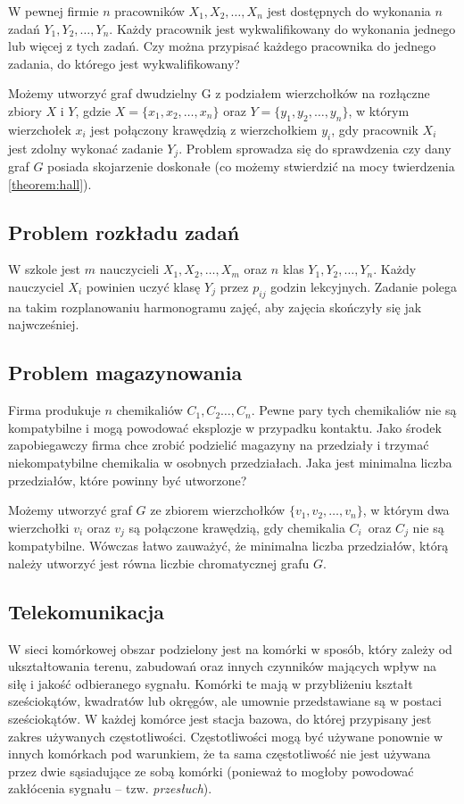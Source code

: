 W pewnej firmie $n$ pracowników $X_1,X_2,\ldots,X_n$ jest dostępnych do wykonania $n$ zadań $Y_1,Y_2,\ldots,Y_n$. Każdy pracownik jest wykwalifikowany do wykonania jednego lub więcej z tych zadań. Czy można przypisać każdego pracownika do jednego zadania, do którego jest wykwalifikowany? 

Możemy utworzyć graf dwudzielny G z podziałem wierzchołków na rozłączne zbiory $X$ i $Y$, gdzie $X=\{x_1,x_2,\ldots,x_n\}$ oraz $Y=\{y_1,y_2,\ldots,y_n\}$, w którym wierzchołek $x_i$ jest połączony krawędzią z wierzchołkiem $y_i$, gdy pracownik $X_i$ jest zdolny wykonać zadanie $Y_j$. Problem sprowadza się do sprawdzenia czy dany graf $G$ posiada skojarzenie doskonałe (co możemy stwierdzić na mocy twierdzenia \ref{theorem:hall}).


\subsection*{Problem rozkładu zadań}

W szkole jest $m$ nauczycieli $X_1,X_2,\ldots,X_m$ oraz $n$ klas $Y_1,Y_2,\ldots,Y_n$. Każdy nauczyciel $X_i$ powinien uczyć klasę $Y_j$ przez $p_{ij}$ godzin lekcyjnych. Zadanie polega na takim rozplanowaniu harmonogramu zajęć, aby zajęcia skończyły się jak najwcześniej. 


\subsection*{Problem magazynowania}

Firma produkuje $n$ chemikaliów $C_1,C_2\ldots,C_n$. Pewne pary tych chemikaliów nie są kompatybilne i mogą powodować eksplozje w przypadku kontaktu. Jako środek zapobiegawczy firma chce zrobić podzielić magazyny na przedziały i trzymać niekompatybilne chemikalia w osobnych przedziałach. Jaka jest minimalna liczba przedziałów, które powinny być utworzone?

Możemy utworzyć graf $G$ ze zbiorem wierzchołków $\{v_1,v_2,\ldots,v_n\}$, w którym dwa wierzchołki $v_i$ oraz $v_j$ są połączone krawędzią, gdy chemikalia $C_i$~oraz $C_j$ nie są kompatybilne. Wówczas łatwo zauważyć, że minimalna liczba przedziałów, którą należy utworzyć jest równa liczbie chromatycznej grafu $G$. 


\subsection*{Telekomunikacja}

W sieci komórkowej obszar podzielony jest na komórki w sposób, który zależy od  ukształtowania terenu, zabudowań oraz innych czynników mających wpływ na siłę i jakość odbieranego sygnału. Komórki te mają w przybliżeniu kształt sześciokątów, kwadratów lub okręgów, ale umownie przedstawiane są w postaci sześciokątów. W każdej komórce jest stacja bazowa, do której przypisany jest zakres używanych częstotliwości. Częstotliwości mogą być używane ponownie w innych komórkach pod warunkiem, że ta sama częstotliwość nie jest używana przez dwie sąsiadujące ze sobą komórki (ponieważ to mogłoby powodować zakłócenia sygnału -- tzw. \emph{przesłuch}).

